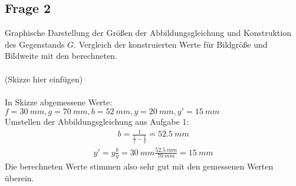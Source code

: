\documentclass[a4paper,10pt]{scrartcl}
\begin{document}
		\subsection{Frage 2}
			Graphische Darstellung der Größen der Abbildungsgleichung und Konstruktion des Gegenstands \(G\). Vergleich der konstruierten Werte für Bildgröße und Bildweite mit den berechneten.\\
			\\
			(Skizze hier einfügen)\\
			\\
			In Skizze abgemessene Werte:\\
			\(f=\SI{30}{mm}, g=\SI{70}{mm}, b=\SI{52}{mm},y=\SI{20}{mm},y'=\SI{15}{mm}\) \\
			Umstellen der Abbildungsgleichung aus Aufgabe 1:
			\begin{align*}
			b=\frac{1}{\frac{1}{f}-\frac{1}{g}}=\SI{52,5}{mm}
			\end{align*}
			\begin{align*}
			y'=y\frac{b}{g}=\SI{30}{mm}\frac{\SI{52,5}{mm}}{\SI{70}{mm}}=\SI{15}{mm}
			\end{align*}
			Die berechneten Werte stimmen also sehr gut mit den gemessenen Werten überein.
			
\end{document}
